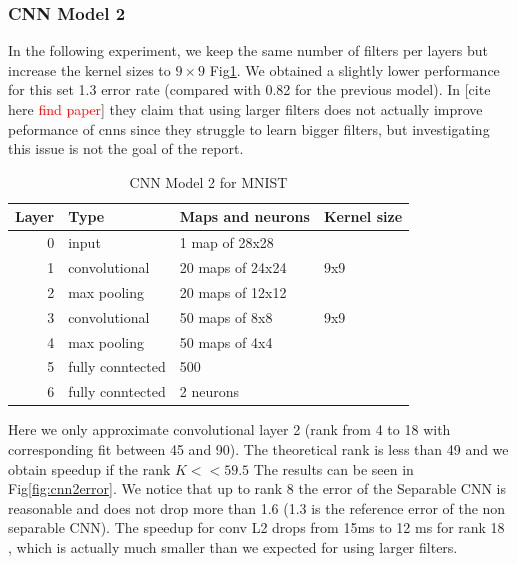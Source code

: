 \subsubsection{CNN Model 2}
In the following experiment, we keep the same number of filters per layers but increase the
kernel sizes to $9\times9$ Fig\ref{fig:CNN2}. We obtained a slightly lower performance for this set 1.3 error rate (compared with 0.82 for the previous model). In [cite here \textcolor{red}{find paper}]
they claim that using larger filters does not actually improve peformance of cnns since they struggle to learn bigger filters, but investigating this issue is not the goal of the report.
\begin{table}
\centering
\begin{tabular}{@{}rlll@{}}\toprule
Layer & Type & Maps and neurons& Kernel size \\ \midrule
0 & input & 1 map of 28x28 &\\
1& convolutional & 20 maps of 24x24 & 9x9\\
2 & max pooling & 20 maps of 12x12 &  \\
3 & convolutional & 50 maps of 8x8& 9x9 \\
4 & max pooling & 50 maps of 4x4&  \\ 
5 & fully conntected& 500 & \\
6 & fully conntected & 2 neurons & \\ \bottomrule
\end{tabular}
\caption{CNN Model 2 for MNIST}
\label{fig:CNN2}
\end{table}
Here we only approximate convolutional layer 2 (rank from 4 to 18 with corresponding fit between 45 and 90). The theoretical rank is less than 49 and we obtain speedup if the rank $K << 59.5$
The results can be seen in Fig\ref{fig:cnn2error}. We notice that up to rank 8 the error of the Separable CNN is reasonable and does not drop more than 1.6 (1.3 is the reference error of the non separable CNN). The speedup for conv L2 drops from 15ms to 12 ms for rank 18 , which is actually much smaller than we expected for using larger filters.
